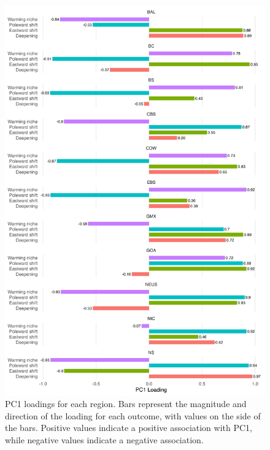 \documentclass[11pt]{article}
\begin{document}
\newpage
\begin{figure}[h]
    \centering
        \includegraphics[scale=0.6]{images/loadings.png}
    \caption{PC1 loadings for each region. Bars represent the magnitude and direction of the loading for each outcome, with values on the side of the bars. Positive values indicate a positive association with PC1, while negative values indicate a negative association.
}
    \label{fig:loadings}
\end{figure}

\clearpage
\end{document}
